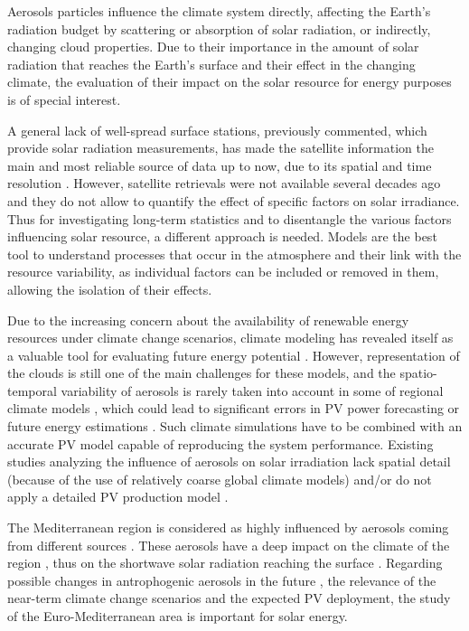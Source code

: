 Aerosols particles influence the climate system directly, affecting the Earth’s radiation budget by scattering or absorption of solar radiation, or indirectly, changing cloud properties. Due to their importance in the amount of solar radiation that reaches the Earth’s surface and their effect in the changing climate, the evaluation of their impact on the solar resource for energy purposes is of special interest.

A general lack of well-spread surface stations, previously commented, which provide solar radiation measurements, has made the satellite information the main and most reliable source of data up to now, due to its spatial and time resolution \cite*{Posselt2012, Ineichen2014}. However, satellite retrievals were not available several decades ago and they do not allow to quantify the effect of specific factors on solar irradiance. Thus for investigating long-term statistics and to disentangle the various factors influencing solar resource, a different approach is needed. Models are the best tool to understand processes that occur in the atmosphere and their link with the resource variability, as individual factors can be included or removed in them, allowing the isolation of their effects.

Due to the increasing concern about the availability of renewable energy resources under climate change scenarios, climate modeling has revealed itself as a valuable tool for evaluating future energy potential \cite*{Crook2011, Gaetani2014, Gaetani2015, Jerez2015, Jerez2015climix, Tobin2016}. However, representation of the clouds is still one of the main challenges for these models, and the spatio-temporal variability of aerosols is rarely taken into account in some of regional climate models \cite*{Bartok2017}, which could lead to significant errors in PV power forecasting or future energy estimations \cite*{Rieger2017}. Such climate simulations have to be combined with an accurate PV model capable of reproducing the system performance. Existing studies analyzing the influence of aerosols on solar irradiation lack spatial detail (because of the use of relatively coarse global climate models) and/or do not apply a detailed PV production model \cite*{Bergin2017}. 

The Mediterranean region is considered as highly influenced by aerosols coming from different sources \cite*{Lelieveld}. These aerosols have a deep impact on the climate of the region \cite*{Nabat2015, Nabat2015a}, thus on the shortwave solar radiation reaching the surface \cite*{Mallet2016}. Regarding possible changes in antrophogenic aerosols in the future \cite*{Gaetani2014, Jimenez-Guerrero2011}, the relevance of the near-term climate change scenarios and the expected PV deployment, the study of the Euro-Mediterranean area is important for solar energy.

